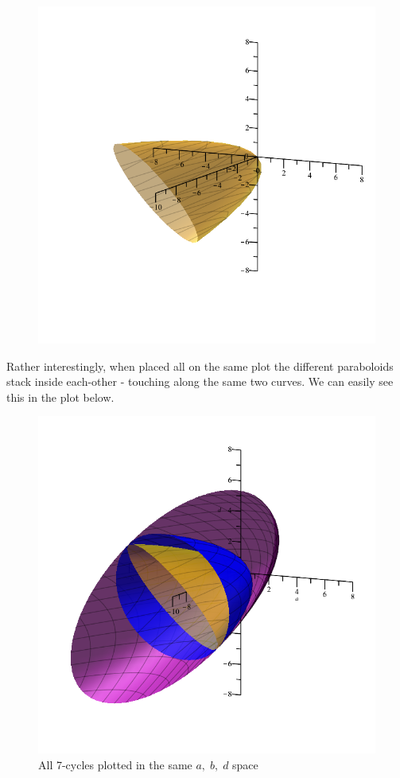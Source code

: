 \documentclass[12pt]{article}
\begin{document}
\begin{figure}[H]
\begin{minipage}{.3\textwidth}
		\label{fig:test1}
	\end{minipage}%
	\begin{minipage}{.3\textwidth}
		\centering
		\includegraphics[width=\linewidth]{mob7cyc6.png}
		\label{fig:test2}
	\end{minipage}
\end{figure}
\noindent Rather interestingly, when placed all on the same plot the different paraboloids stack inside each-other - touching along the same two curves. We can easily see this in the plot below.
\begin{figure}[H]
	\centering
	\includegraphics[scale=0.3]{mob7Cyc.png}
	\caption{All 7-cycles plotted in the same $a,\;b,\;d$ space}
\end{figure}
\end{document}
